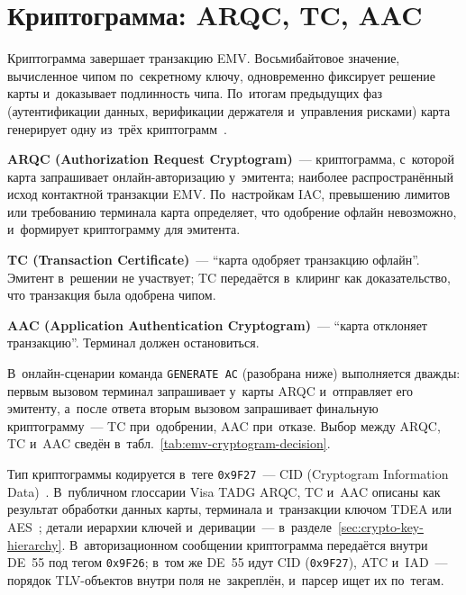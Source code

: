 \section{Криптограмма: ARQC, TC, AAC}\label{sec:emv-cryptogram}

Криптограмма завершает транзакцию EMV. Восьмибайтовое значение, вычисленное
чипом по~секретному ключу, одновременно фиксирует решение карты и~доказывает
подлинность чипа. По~итогам предыдущих фаз (аутентификации данных, верификации
держателя и~управления рисками) карта генерирует одну из~трёх
криптограмм~\cite{emvco-book3}.

\textbf{ARQC (Authorization Request Cryptogram)}~--- криптограмма, с~которой
карта запрашивает онлайн-авторизацию у~эмитента; наиболее распространённый исход
контактной транзакции EMV. По~настройкам IAC, превышению лимитов или требованию
терминала карта определяет, что одобрение офлайн невозможно, и~формирует
криптограмму для эмитента.

\textbf{TC (Transaction Certificate)}~--- \enquote{карта одобряет транзакцию
офлайн}. Эмитент в~решении не участвует; TC передаётся в~клиринг как
доказательство, что транзакция была одобрена чипом.

\textbf{AAC (Application Authentication Cryptogram)}~--- \enquote{карта
отклоняет транзакцию}. Терминал должен остановиться.

В~онлайн-сценарии команда \texttt{GENERATE AC} (разобрана ниже) выполняется
дважды: первым вызовом терминал запрашивает у~карты ARQC и~отправляет его
эмитенту, а~после ответа вторым вызовом запрашивает финальную криптограмму~---
TC при~одобрении, AAC при~отказе. Выбор между ARQC, TC и~AAC сведён
в~табл.~\ref{tab:emv-cryptogram-decision}.

Тип криптограммы кодируется в~теге \texttt{0x9F27}~--- CID (Cryptogram
Information Data)~\cite{emvco-book3}. В~публичном глоссарии Visa TADG ARQC, TC
и~AAC описаны как результат обработки данных карты, терминала и~транзакции
ключом TDEA или AES~\cite{visa-tadg}; детали иерархии ключей и~деривации~---
в~разделе~\ref{sec:crypto-key-hierarchy}. В~авторизационном сообщении
криптограмма передаётся внутри DE~55 под тегом \texttt{0x9F26}; в~том же DE~55
идут CID (\texttt{0x9F27}), ATC и~IAD~--- порядок TLV-объектов внутри поля
не~закреплён, и~парсер ищет их по~тегам.

